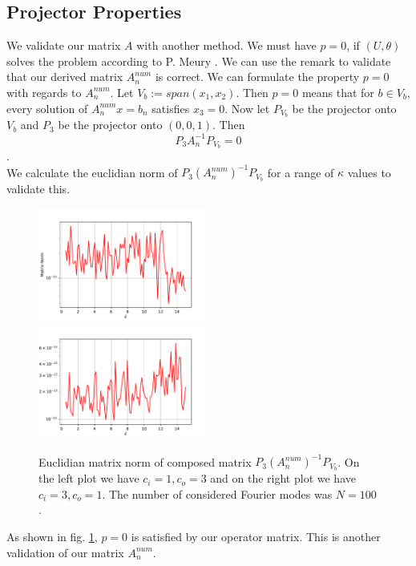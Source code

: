 \documentclass[12pt,journal,compsoc, onecolumn]{IEEEtran}
\begin{document}
\subsection{Projector Properties}
\label{subsection:projector_properties}
We validate our matrix $A$ with another method. We must have \(p=0\), if \((U, \theta)\) solves the problem according to P. Meury \cite{meury2007stable}. 
We can use the remark to validate that our derived matrix $A^{num}_n$ is correct.  We can formulate the property $p = 0$ with regards to $A^{num}_n$. 
Let $V_{{b}} := span( {x}_1, {x}_2)$. 
Then $p = 0$ means that for ${b} \in V_{{b}}$, every solution of  $A_n^{num} {x} = {b}_n$ satisfies $x_3 = 0$. Now let
$P_{V_{{b}}}$ be the projector onto $V_{{b}}$ and $P_3$ be the projector onto $(0, 0, 1)$.
Then $$P_3A_n^{-1}P_{V_{{b}}} = 0$$. \\
We calculate the euclidian norm of $P_3 (A^{num}_n)^{-1}P_{V_{{b}}}$ for a range of $\kappa$ values to validate this.
\begin{figure}
    \includegraphics[width=0.5\textwidth]{validate_p_c_i1.0c_o3.0N_100plotRangeStart_0.5plotRangeEnd_15.0.pdf}
    \includegraphics[width=0.5\textwidth]{validate_p_c_i3.0c_o1.0N_100plotRangeStart_0.5plotRangeEnd_15.0.pdf}
    \caption{Euclidian matrix norm of composed matrix  $P_3 (A^{num}_n)^{-1}P_{V_{{b}}}$. 
    On the left plot we have $c_i = 1, c_o = 3$
    and on the right plot we have $c_i = 3, c_o = 1$. The number of considered Fourier modes was $N = 100$.
    }
   \label{fig:p_validation}
\end{figure}
\noindent
As shown in fig. \ref{fig:p_validation}, $p = 0$ is satisfied by our operator matrix. This is another validation of our matrix $A_n^{num}$. 
\end{document}
